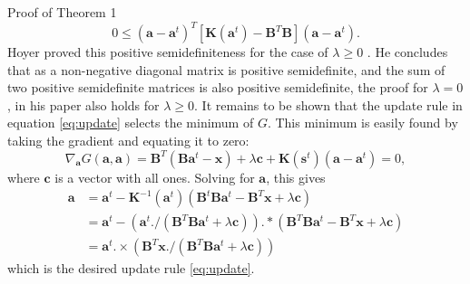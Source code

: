 \begin{proof2}{Proof of Theorem 1}
\begin{equation}
0 \leq (\mathbf{a}-\mathbf{a}^t)^T[\mathbf{K}(\mathbf{a}^t) - \mathbf{B}^T\mathbf{B}](\mathbf{a}-\mathbf{a}^t).
\end{equation}
Hoyer proved this positive semidefiniteness for the case of $\lambda \geq 0$ \cite{hoyer}. He concludes that as a non-negative diagonal matrix is positive semidefinite, and the sum of two positive semidefinite matrices is also positive semidefinite, the proof for $\lambda = 0$, in his paper also holds for $\lambda \geq 0$.
It remains to be shown that the update rule in equation \ref{eq:update} selects the minimum of $G$. This minimum is easily found by taking the gradient and equating it to zero:
\begin{equation}
\nabla_\mathbf{a} G(\mathbf{a},\mathbf{a}) = \mathbf{B}^T(\mathbf{B}\mathbf{a}^t-\mathbf{x}) + \lambda\mathbf{c} + \mathbf{K}(\mathbf{s}^t)(\mathbf{a}-\mathbf{a}^t)=0,
\end{equation}
where $\mathbf{c}$ is a vector with all ones. Solving for $\mathbf{a}$, this gives
\begin{align}
\mathbf{a} & = \mathbf{a}^t - \mathbf{K}^{-1}(\mathbf{a}^t)(\mathbf{B}^t\mathbf{B}\mathbf{a}^t-\mathbf{B}^T\mathbf{x}+\lambda \mathbf{c}) \\
& = \mathbf{a}^t-(\mathbf{a}^t./(\mathbf{B}^T\mathbf{B}\mathbf{a}^t+\lambda\mathbf{c})).* (\mathbf{B}^T\mathbf{B}\mathbf{a}^t - \mathbf{B}^T\mathbf{x}+\lambda \mathbf{c}) \\
& = \mathbf{a}^t.\times (\mathbf{B}^T\mathbf{x}./(\mathbf{B}^T\mathbf{B}\mathbf{a}^t+\lambda\mathbf{c}))
\end{align}
which is the desired update rule \ref{eq:update}.
\label{proof:noninc}
\end{proof2}


